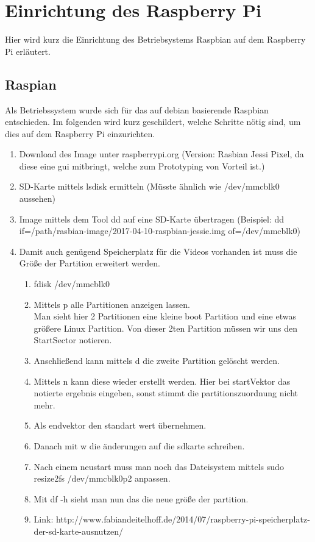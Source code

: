 \section{Einrichtung des Raspberry Pi}
\label{sec:Einrichtung_Raspi}

Hier wird kurz die Einrichtung des Betriebsystems Raspbian auf dem Raspberry Pi erläutert.

\subsection{Raspian}

Als Betriebssystem wurde sich für das auf debian basierende Raspbian entschieden. Im folgenden wird kurz geschildert, welche Schritte nötig sind, um dies auf dem Raspberry Pi einzurichten.

\begin{enumerate}
  \item Download des Image unter raspberrypi.org (Version: Rasbian Jessi Pixel, da diese eine gui mitbringt, welche zum Prototyping von Vorteil ist.)
  \item SD-Karte mittels lsdisk ermitteln (Müsste ähnlich wie /dev/mmcblk0 aussehen)
  \item Image mittels dem Tool dd auf eine SD-Karte übertragen (Beispiel: dd if=/path/rasbian-image/2017-04-10-raspbian-jessie.img of=/dev/mmcblk0)
  \item Damit auch genügend Speicherplatz für die Videos vorhanden ist muss die Größe der Partition erweitert werden. \\
  \begin {enumerate}
    \item fdisk /dev/mmcblk0
    \item Mittels p alle Partitionen anzeigen lassen. \\ Man sieht hier 2 Partitionen eine kleine boot Partition und eine etwas größere Linux Partition. Von dieser 2ten   Partition müssen wir uns den StartSector notieren. 
    \item Anschließend kann mittels d die zweite Partition gelöscht werden. 
    \item Mittels n kann diese wieder erstellt werden. Hier bei startVektor das notierte ergebnis eingeben, sonst stimmt die partitionszuordnung nicht mehr. 
    \item Als endvektor den standart wert übernehmen.
    \item Danach mit w die änderungen auf die sdkarte schreiben.
    \item Nach einem neustart muss man noch das Dateisystem mittels sudo resize2fs /dev/mmcblk0p2 anpassen.
    \item Mit df -h sieht man nun das die neue größe der partition.
    \item Link: http://www.fabiandeitelhoff.de/2014/07/raspberry-pi-speicherplatz-der-sd-karte-ausnutzen/
  \end{enumerate}
\end{enumerate}



